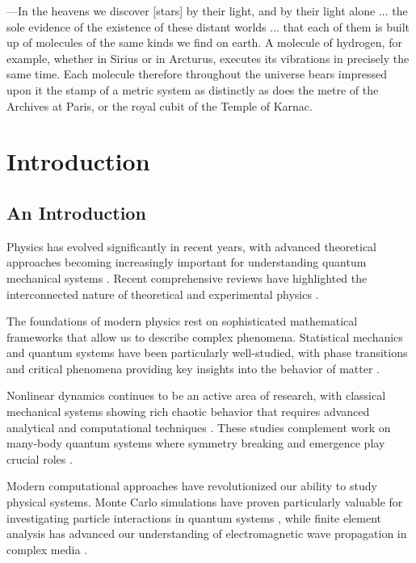 \begin{savequote}[60mm]
---In the heavens we discover [stars] by their light, and by their light alone ... the sole evidence of the existence of these distant worlds ... that each of them is built up of molecules of the same kinds we find on earth. A molecule of hydrogen, for example, whether in Sirius or in Arcturus, executes its vibrations in precisely the same time. Each molecule therefore throughout the universe bears impressed upon it the stamp of a metric system as distinctly as does the metre of the Archives at Paris, or the royal cubit of the Temple of Karnac.
\end{savequote}

\chapter{Introduction}
\label{chap:intro}
\glsresetall
\newrefsegment

\section{An Introduction}

Physics has evolved significantly in recent years, with advanced theoretical approaches becoming increasingly important for understanding quantum mechanical systems \autocite{yourname2024nature}. Recent comprehensive reviews have highlighted the interconnected nature of theoretical and experimental physics \autocite{expert2023review}.

The foundations of modern physics rest on sophisticated mathematical frameworks that allow us to describe complex phenomena. Statistical mechanics and quantum systems have been particularly well-studied, with phase transitions and critical phenomena providing key insights into the behavior of matter \autocite{chen2023apjl}.

Nonlinear dynamics continues to be an active area of research, with classical mechanical systems showing rich chaotic behavior that requires advanced analytical and computational techniques \autocite{santos2021prl}. These studies complement work on many-body quantum systems where symmetry breaking and emergence play crucial roles \autocite{adams2022pasp}.

\lipsum[1-2]

Modern computational approaches have revolutionized our ability to study physical systems. Monte Carlo simulations have proven particularly valuable for investigating particle interactions in quantum systems \autocite{yourname2022jlt}, while finite element analysis has advanced our understanding of electromagnetic wave propagation in complex media \autocite{white2022ao}.

